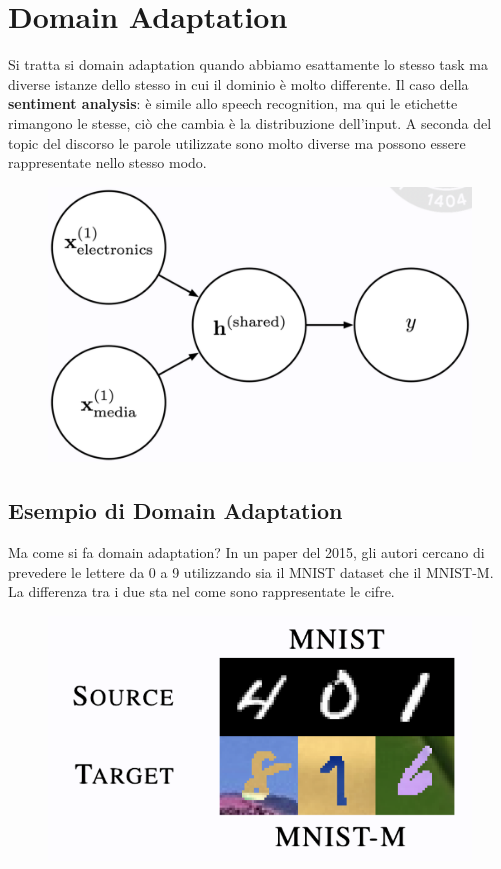 \section{Domain Adaptation}
Si tratta si domain adaptation quando abbiamo esattamente lo stesso task ma diverse istanze dello stesso in
cui il dominio è molto differente. Il caso della \textbf{sentiment analysis}: è simile allo speech recognition,
ma qui le etichette rimangono le stesse, ciò che cambia è la distribuzione dell'input. A seconda del topic
del discorso le parole utilizzate sono molto diverse ma possono essere rappresentate nello stesso modo.
\begin{figure}[!h]
  \includegraphics[scale=.3]{images/representation_learning/sentiment_an.png}
  \centering
\end{figure}

\subsection{Esempio di Domain Adaptation}
Ma come si fa domain adaptation? In un paper del 2015, gli autori cercano di prevedere le lettere da 0 a 9 
utilizzando sia il MNIST dataset che il MNIST-M. La differenza tra i due sta nel come sono rappresentate le
cifre. 
\begin{figure}[!h]
  \includegraphics[scale=.4]{images/representation_learning/mnist.png}
  \centering
\end{figure}



